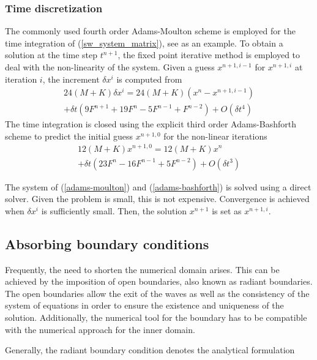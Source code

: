 \subsubsection{Time discretization}

The commonly used fourth order Adams-Moulton scheme is employed for the time integration of (\ref{sw_system_matrix}), see \cite{wei1995,woo2004a,codina2008b} as an example.
To obtain a solution at the time step $t^{n+1}$, the fixed point iterative method is employed to deal with the non-linearity of the system. Given a guess $x^{n+1,i-1}$ for $x^{n+1,i}$ at iteration $i$, the increment $\delta x^i$ is computed from
\begin{multline}
    24 (M + K) \delta x^i = 
    24 (M + K) (x^n - x^{n+1,i-1}) \\
     + \delta t (9F^{n+1} + 19F^n - 5F^{n-1} + F^{n-2}) + O(\delta t^4)
    \label{adams-moulton}
\end{multline}
The time integration is closed using the explicit third order Adams-Bashforth scheme to predict the initial guess $x^{n+1,0}$ for the non-linear iterations
\begin{multline}
    12 (M + K) x^{n+1,0} = 
    12 (M + K) x^n \\
     + \delta t (23F^n - 16F^{n-1} + 5F^{n-2}) + O(\delta t^3)
    \label{adams-bashforth}
\end{multline}

The system of (\ref{adams-moulton}) and (\ref{adams-bashforth}) is solved using a direct solver. Given the problem is small, this is not expensive.
Convergence is achieved when $\delta x^i$ is sufficiently small. Then, the solution $x^{n+1}$ is set as $x^{n+1,i}$.





\subsection{Absorbing boundary conditions}

Frequently, the need to shorten the numerical domain arises. This can be achieved by the imposition of open boundaries, also known as radiant boundaries. The open boundaries allow the exit of the waves as well as the consistency of the system of equations in order to ensure the existence and uniqueness of the solution. Additionally, the numerical tool for the boundary has to be compatible with the numerical approach for the inner domain.

Generally, the radiant boundary condition denotes the analytical formulation

